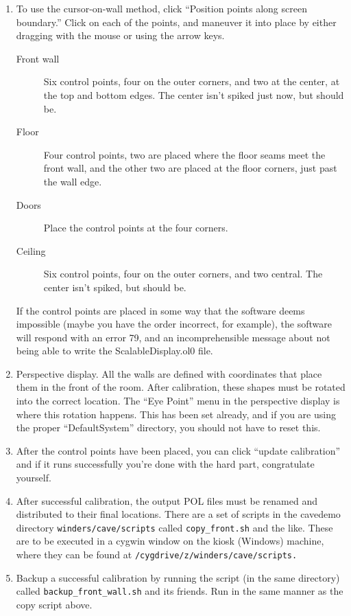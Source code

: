 \documentclass[11pt]{article}
\newcommand{\cmd}[1]{\texttt{#1}}
\begin{document}
\begin{enumerate}
\item To use the cursor-on-wall method, click ``Position points along
  screen boundary.''  Click on each of the points, and maneuver it
  into place by either dragging with the mouse or using the arrow keys.

  \begin{description}

  \item[Front wall] Six control points, four on the outer corners, and
    two at the center, at the top and bottom edges.  The center isn't
    spiked just now, but should be.

  \item[Floor] Four control points, two are placed where the floor
    seams meet the front wall, and the other two are placed at the
    floor corners, just past the wall edge.

  \item[Doors] Place the control points at the four corners.

  \item[Ceiling] Six control points, four on the outer corners, and
    two central.  The center isn't spiked, but should be.

  \end{description}

  If the control points are placed in some way that the software deems
  impossible (maybe you have the order incorrect, for example), the
  software will respond with an error 79, and an incomprehensible
  message about not being able to write the ScalableDisplay.ol0 file.

\item Perspective display.  All the walls are defined with coordinates
  that place them in the front of the room.  After calibration, these
  shapes must be rotated into the correct location.  The ``Eye Point''
  menu in the perspective display is where this rotation happens.
  This has been set already, and if you are using the proper
  ``DefaultSystem'' directory, you should not have to reset this.

\item After the control points have been placed, you can click
  ``update calibration'' and if it runs successfully you're done with
  the hard part, congratulate yourself.

\item After successful calibration, the output POL files must be
  renamed and distributed to their final locations.  There are a set
  of scripts in the cavedemo directory \cmd{winders/cave/scripts}
  called \cmd{copy\_front.sh} and the like.  These are to be executed in
  a cygwin window on the kiosk (Windows) machine, where they can be
  found at \cmd{/cygdrive/z/winders/cave/scripts.}

\item Backup a successful calibration by running the script (in the
  same directory) called \cmd{backup\_front\_wall.sh} and its friends.
  Run in the same manner as the copy script above.


\end{enumerate}
\end{document}
